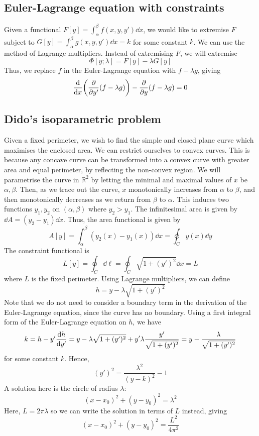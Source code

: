 \subsection{Euler-Lagrange equation with constraints}
Given a functional \( F[y] = \int_\alpha^\beta f(x,y,y') \dd{x} \), we would like to extremise \( F \) subject to \( G[y] = \int_\alpha^\beta g(x,y,y') \dd{x} = k \) for some constant \( k \).
We can use the method of Lagrange multipliers.
Instead of extremising \( F \), we will extremise
\[
	\Phi[y;\lambda] = F[y] - \lambda G[y]
\]
Thus, we replace \( f \) in the Euler-Lagrange equation with \( f - \lambda g \), giving
\[
	\dv{x}\qty(\pdv{y'}(f-\lambda g)) - \pdv{y}(f-\lambda g) = 0
\]

\subsection{Dido's isoparametric problem}
Given a fixed perimeter, we wish to find the simple and closed plane curve which maximises the enclosed area.
We can restrict ourselves to convex curves.
This is because any concave curve can be transformed into a convex curve with greater area and equal perimeter, by reflecting the non-convex region.
We will parametrise the curve in \( \mathbb R^2 \) by letting the minimal and maximal values of \( x \) be \( \alpha, \beta \).
Then, as we trace out the curve, \( x \) monotonically increases from \( \alpha \) to \( \beta \), and then monotonically decreases as we return from \( \beta \) to \( \alpha \).
This induces two functions \( y_1, y_2 \) on \( (\alpha, \beta) \) where \( y_2 > y_1 \).
The infinitesimal area is given by \( \dd{A} = (y_2 - y_1) \dd{x} \).
Thus, the area functional is given by
\[
	A[y] = \int_\alpha^\beta (y_2(x) - y_1(x))\dd{x} = \oint_C y(x) \dd{y}
\]
The constraint functional is
\[
	L[y] = \oint_C \dd{\ell} = \oint_C \sqrt{1 + (y')^2} \dd{x} = L
\]
where \( L \) is the fixed perimeter.
Using Lagrange multipliers, we can define
\[
	h = y - \lambda \sqrt{1 + (y')^2}
\]
Note that we do not need to consider a boundary term in the derivation of the Euler-Lagrange equation, since the curve has no boundary.
Using a first integral form of the Euler-Lagrange equation on \( h \), we have
\[
	k = h - y'\dv{h}{y'} = y - \lambda \sqrt{1 + (y')^2} + y' \lambda \frac{y'}{\sqrt{1 + (y')^2}} = y - \frac{\lambda}{\sqrt{1 + (y')^2}}
\]
for some constant \( k \).
Hence,
\[
	(y')^2 = \frac{\lambda^2}{(y - k)^2} - 1
\]
A solution here is the circle of radius \( \lambda \):
\[
	(x - x_0)^2 + (y - y_0)^2 = \lambda^2
\]
Here, \( L = 2 \pi \lambda \) so we can write the solution in terms of \( L \) instead, giving
\[
	(x - x_0)^2 + (y - y_0)^2 = \frac{L^2}{4\pi^2}
\]

